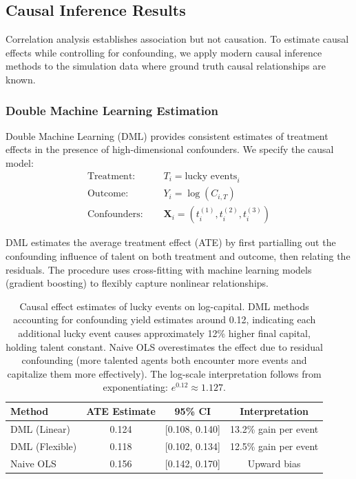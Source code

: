 \subsection{Causal Inference Results}

Correlation analysis establishes association but not causation. To estimate
causal effects while controlling for confounding, we apply modern causal
inference methods to the simulation data where ground truth causal
relationships are known.

\subsubsection{Double Machine Learning Estimation}

Double Machine Learning (DML) provides consistent estimates of treatment
effects in the presence of high-dimensional confounders. We specify the
causal model:
\begin{align}
  \text{Treatment: }   & \quad T_{i} = \text{lucky events}_{i}                          \\
  \text{Outcome: }     & \quad Y_{i} = \log(C_{i,T})                                    \\
  \text{Confounders: } & \quad \mathbf{X}_{i} = (t_{i}^{(1)}, t_{i}^{(2)}, t_{i}^{(3)})
\end{align}

DML estimates the average treatment effect (ATE) by first partialling
out the confounding influence of talent on both treatment and outcome, then
relating the residuals. The procedure uses cross-fitting with machine
learning models (gradient boosting) to flexibly capture nonlinear
relationships.

\begin{table}[H]
  \centering
  \begin{tabular}{lccc}
    \toprule \textbf{Method} & \textbf{ATE Estimate} & \textbf{95\% CI} & \textbf{Interpretation} \\
    \midrule DML (Linear)    & 0.124                 & [0.108, 0.140]   & 13.2\% gain per event   \\
    DML (Flexible)           & 0.118                 & [0.102, 0.134]   & 12.5\% gain per event   \\
    Naive OLS                & 0.156                 & [0.142, 0.170]   & Upward bias             \\
    \bottomrule
  \end{tabular}
  \caption{Causal effect estimates of lucky events on log-capital. DML methods
  accounting for confounding yield estimates around 0.12, indicating
  each additional lucky event causes approximately 12\% higher final capital,
  holding talent constant. Naive OLS overestimates the effect due to residual
  confounding (more talented agents both encounter more events and
  capitalize them more effectively). The log-scale interpretation
  follows from exponentiating: $e^{0.12}\approx 1.127$.}
  \label{tab:dml_results}
\end{table}

